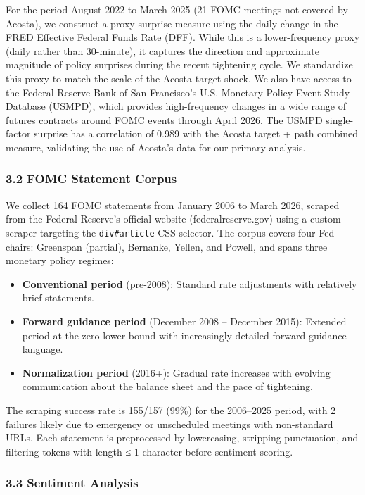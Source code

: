 \documentclass[12pt]{article}
\providecommand{\tightlist}{%
  \setlength{\itemsep}{0pt}\setlength{\parskip}{0pt}}
\begin{document}
For the period August 2022 to March 2025 (21 FOMC meetings not covered
by Acosta), we construct a proxy surprise measure using the daily change
in the FRED Effective Federal Funds Rate (DFF). While this is a
lower-frequency proxy (daily rather than 30-minute), it captures the
direction and approximate magnitude of policy surprises during the
recent tightening cycle. We standardize this proxy to match the scale of
the Acosta target shock. We also have access to the Federal Reserve Bank
of San Francisco's U.S. Monetary Policy Event-Study Database (USMPD),
which provides high-frequency changes in a wide range of futures
contracts around FOMC events through April 2026. The USMPD single-factor
surprise has a correlation of 0.989 with the Acosta target + path
combined measure, validating the use of Acosta's data for our primary
analysis.

\subsubsection{3.2 FOMC Statement Corpus}\label{fomc-statement-corpus}

We collect 164 FOMC statements from January 2006 to March 2026, scraped
from the Federal Reserve's official website (federalreserve.gov) using a
custom scraper targeting the \texttt{div\#article} CSS selector. The
corpus covers four Fed chairs: Greenspan (partial), Bernanke, Yellen,
and Powell, and spans three monetary policy regimes:

\begin{itemize}
\tightlist
\item
  \textbf{Conventional period} (pre-2008): Standard rate adjustments
  with relatively brief statements.
\item
  \textbf{Forward guidance period} (December 2008 -- December 2015):
  Extended period at the zero lower bound with increasingly detailed
  forward guidance language.
\item
  \textbf{Normalization period} (2016+): Gradual rate increases with
  evolving communication about the balance sheet and the pace of
  tightening.
\end{itemize}

The scraping success rate is 155/157 (99\%) for the 2006--2025 period,
with 2 failures likely due to emergency or unscheduled meetings with
non-standard URLs. Each statement is preprocessed by lowercasing,
stripping punctuation, and filtering tokens with length ≤ 1 character
before sentiment scoring.

\subsubsection{3.3 Sentiment Analysis}\label{sentiment-analysis}
\end{document}
